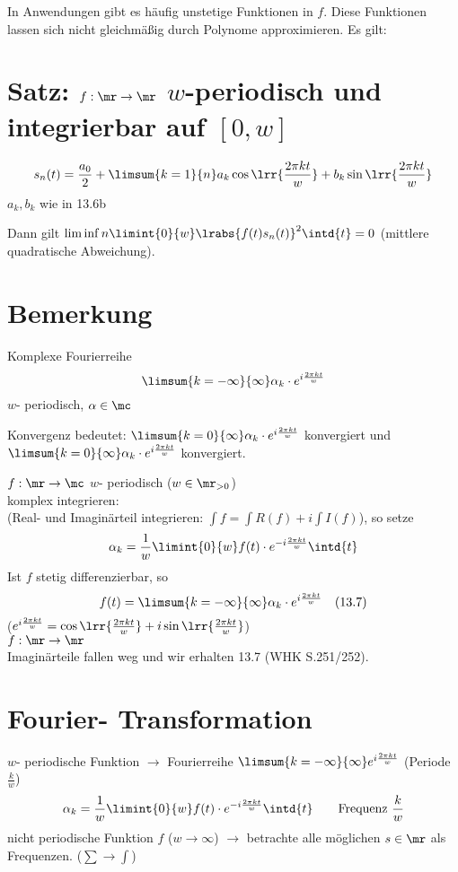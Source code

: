 	In Anwendungen gibt es häufig unstetige Funktionen in $f$. Diese Funktionen lassen sich nicht gleichmäßig durch Polynome approximieren. Es gilt:
	
\section{Satz: \texorpdfstring{$f:\mr\rightarrow\mr$}{Funktion von R nach R} \texorpdfstring{$w$}{w}-periodisch und integrierbar auf \texorpdfstring{$[0,w]$}{[0,w]}}
	\[s_n(t)=\dfrac{a_0}{2}+\limsum{k=1}{n}a_k\cos\lrr{\dfrac{2\pi kt}{w}}+b_k\sin\lrr{\dfrac{2\pi kt}{w}}\]
	$ a_k,b_k $ wie in 13.6b
	
	Dann gilt $ \liminf{n}\limint{0}{w}\lrabs{f(t)s_n(t)}^2\intd{t}=0 $ (mittlere quadratische Abweichung).
	
\section{Bemerkung}
	Komplexe Fourierreihe
	\[\limsum{k=-\infty}{\infty}\alpha_k\cdot e^{i\frac{2\pi kt}{w}}\]
	$w$- periodisch, $\alpha\in\mc$
	
	Konvergenz bedeutet:
	$\limsum{k=0}{\infty}\alpha_k\cdot e^{i\frac{2\pi kt}{w}}$ konvergiert und\\
	$\limsum{k=0}{\infty}\alpha_k\cdot e^{i\frac{2\pi kt}{w}}$ konvergiert.
	
	$f:\mr\rightarrow\mc$ $w$- periodisch ($w\in\mr_{>0}$)\\
	komplex integrieren:\\
	(Real- und Imaginärteil integrieren: $\int f=\int R(f)+i\int I(f)$), so setze
	\[ \alpha_k=\dfrac{1}{w}\limint{0}{w}f(t)\cdot e^{-i\frac{2\pi kt}{w}}\intd{t} \]
	Ist $f$ stetig differenzierbar, so
	\[f(t)=\limsum{k=-\infty}{\infty}\alpha_k\cdot e^{i\frac{2\pi kt}{w}}\quad\mbox{(13.7)}\]
	($e^{i\frac{2\pi kt}{w}}=\cos\lrr{\frac{2\pi kt}{w}}+i\sin\lrr{\frac{2\pi kt}{w}}$)\\
	$f:\mr\rightarrow\mr$\\
	Imaginärteile fallen weg und wir erhalten 13.7 (WHK S.251/252).
	
\section{Fourier- Transformation}
	$w$- periodische Funktion $\longrightarrow$ Fourierreihe $\limsum{k=-\infty}{\infty}e^{i\frac{2\pi kt}{w}}$ (Periode $\frac{k}{w}$)
	\[\alpha_k=\dfrac{1}{w}\limint{0}{w}f(t)\cdot e^{-i\frac{2\pi kt}{w}}\intd{t}\qquad\mbox{Frequenz }\dfrac{k}{w}\]
	nicht periodische Funktion $f$ ($w\rightarrow\infty$) $\longrightarrow$ betrachte alle möglichen $s\in\mr$ als Frequenzen. ($\sum\rightarrow\int$)
	
